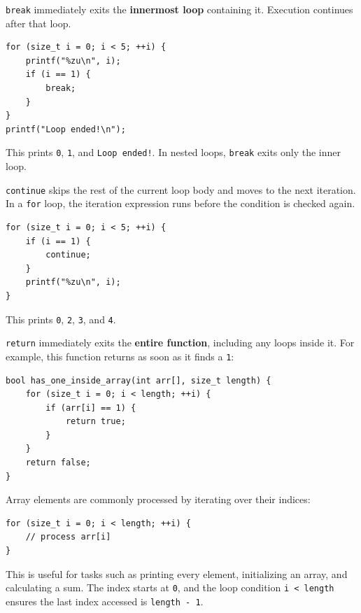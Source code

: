 \documentclass[11pt,a4paper]{article}
\begin{document}
\label{break}
\hypertarget{break}{}

\texttt{break} immediately exits the \textbf{innermost loop} containing it. Execution continues after that loop.

\begin{lstlisting}[style=cscode]
for (size_t i = 0; i < 5; ++i) {
    printf("%zu\n", i);
    if (i == 1) {
        break;
    }
}
printf("Loop ended!\n");
\end{lstlisting}

This prints \texttt{0}, \texttt{1}, and \texttt{Loop\ ended!}. In nested loops, \texttt{break} exits only the inner loop.

\label{continue}
\hypertarget{continue}{}

\texttt{continue} skips the rest of the current loop body and moves to the next iteration. In a \texttt{for} loop, the iteration expression runs before the condition is checked again.

\begin{lstlisting}[style=cscode]
for (size_t i = 0; i < 5; ++i) {
    if (i == 1) {
        continue;
    }
    printf("%zu\n", i);
}
\end{lstlisting}

This prints \texttt{0}, \texttt{2}, \texttt{3}, and \texttt{4}.

\label{return}
\hypertarget{return}{}

\texttt{return} immediately exits the \textbf{entire function}, including any loops inside it. For example, this function returns as soon as it finds a \texttt{1}:

\begin{lstlisting}[style=cscode]
bool has_one_inside_array(int arr[], size_t length) {
    for (size_t i = 0; i < length; ++i) {
        if (arr[i] == 1) {
            return true;
        }
    }
    return false;
}
\end{lstlisting}

\label{43-array-recursion}
\hypertarget{43-array-recursion}{}

Array elements are commonly processed by iterating over their indices:

\begin{lstlisting}[style=cscode]
for (size_t i = 0; i < length; ++i) {
    // process arr[i]
}
\end{lstlisting}

This is useful for tasks such as printing every element, initializing an array, and calculating a sum. The index starts at \texttt{0}, and the loop condition \texttt{i\ \textless{}\ length} ensures the last index accessed is \texttt{length\ -\ 1}.
\end{document}
